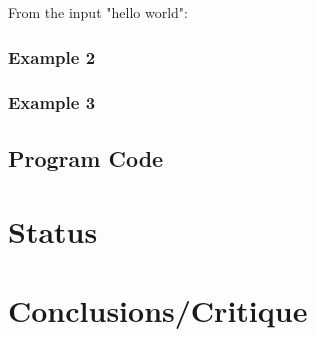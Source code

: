 \documentclass[runningheads,a4paper]{llncs}
\begin{document}
From the input "hello world":


\subsubsection{Example 2}

\subsubsection{Example 3}

\subsection{Program Code}


\section{Status}
\section{Conclusions/Critique}

\end{document}

